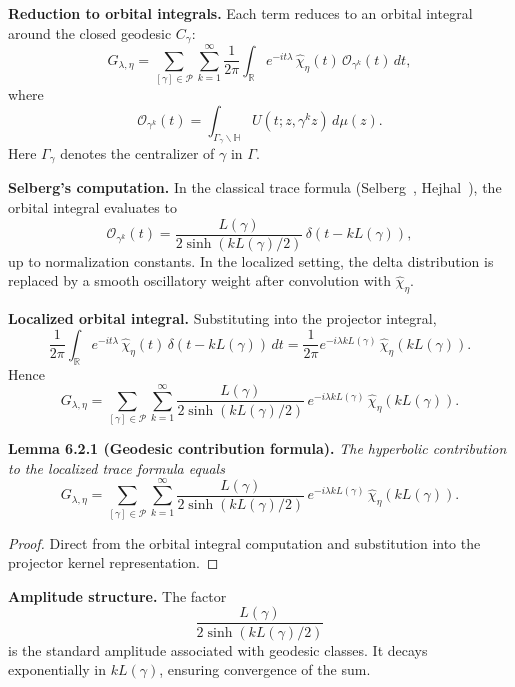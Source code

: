 \medskip

\noindent\textbf{Reduction to orbital integrals.}
Each term reduces to an orbital integral around the closed geodesic $C_\gamma$:
\[
  G_{\lambda,\eta} = \sum_{[\gamma]\in \mathcal{P}} \sum_{k=1}^\infty
  \frac{1}{2\pi}\int_{\mathbb{R}} e^{-it\lambda}\,\widehat{\chi}_\eta(t)\,
  \mathcal{O}_{\gamma^k}(t)\, dt,
\]
where
\[
  \mathcal{O}_{\gamma^k}(t) = \int_{\Gamma_\gamma\backslash\mathbb{H}}
  U(t;z,\gamma^k z)\, d\mu(z).
\]
Here $\Gamma_\gamma$ denotes the centralizer of $\gamma$ in $\Gamma$.

\medskip

\noindent\textbf{Selberg’s computation.}
In the classical trace formula (Selberg~\cite{Selberg1956}, Hejhal~\cite{Hejhal1983}),
the orbital integral evaluates to
\[
  \mathcal{O}_{\gamma^k}(t)
  = \frac{L(\gamma)}{2\sinh(kL(\gamma)/2)}\, \delta(t-kL(\gamma)),
\]
up to normalization constants.
In the localized setting, the delta distribution is replaced by a smooth oscillatory weight after convolution with $\widehat{\chi}_\eta$.

\medskip

\noindent\textbf{Localized orbital integral.}
Substituting into the projector integral,
\[
  \frac{1}{2\pi}\int_{\mathbb{R}} e^{-it\lambda}\, \widehat{\chi}_\eta(t)\, \delta(t-kL(\gamma))\, dt
  = \frac{1}{2\pi} e^{-i\lambda kL(\gamma)}\, \widehat{\chi}_\eta(kL(\gamma)).
\]
Hence
\[
  G_{\lambda,\eta} =
  \sum_{[\gamma]\in \mathcal{P}} \sum_{k=1}^\infty
  \frac{L(\gamma)}{2\sinh(kL(\gamma)/2)}\,
  e^{-i\lambda kL(\gamma)}\, \widehat{\chi}_\eta(kL(\gamma)).
\]

\medskip

\noindent\textbf{Lemma 6.2.1 (Geodesic contribution formula).}
\emph{The hyperbolic contribution to the localized trace formula equals}
\[
  G_{\lambda,\eta} =
  \sum_{[\gamma]\in \mathcal{P}} \sum_{k=1}^\infty
  \frac{L(\gamma)}{2\sinh(kL(\gamma)/2)}\,
  e^{-i\lambda kL(\gamma)}\, \widehat{\chi}_\eta(kL(\gamma)).
\]

\begin{proof}
Direct from the orbital integral computation and substitution into the projector kernel representation.
\end{proof}

\medskip

\noindent\textbf{Amplitude structure.}
The factor
\[
  \frac{L(\gamma)}{2\sinh(kL(\gamma)/2)}
\]
is the standard amplitude associated with geodesic classes.
It decays exponentially in $kL(\gamma)$,
ensuring convergence of the sum.

